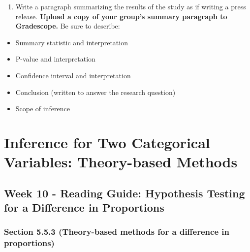 \documentclass[
]{report}
\providecommand{\tightlist}{%
  \setlength{\itemsep}{0pt}\setlength{\parskip}{0pt}}
\begin{document}
\vspace{0.8in}

\begin{enumerate}
\def\labelenumi{\arabic{enumi}.}
\setcounter{enumi}{15}
\tightlist
\item
  Write a paragraph summarizing the results of the study as if writing a press release. \textbf{Upload a copy of your group's summary paragraph to Gradescope.} Be sure to describe:
\end{enumerate}

\begin{itemize}
\item
  Summary statistic and interpretation
\item
  P-value and interpretation
\item
  Confidence interval and interpretation
\item
  Conclusion (written to answer the research question)
\item
  Scope of inference
\end{itemize}

\vspace{2in}

\hypertarget{inference-for-two-categorical-variables-theory-based-methods}{%
\chapter{Inference for Two Categorical Variables: Theory-based Methods}\label{inference-for-two-categorical-variables-theory-based-methods}}

\hypertarget{week-10---reading-guide-hypothesis-testing-for-a-difference-in-proportions}{%
\section{Week 10 - Reading Guide: Hypothesis Testing for a Difference in Proportions}\label{week-10---reading-guide-hypothesis-testing-for-a-difference-in-proportions}}

\hypertarget{section-5.5.3-theory-based-methods-for-a-difference-in-proportions}{%
\subsection*{Section 5.5.3 (Theory-based methods for a difference in proportions)}\label{section-5.5.3-theory-based-methods-for-a-difference-in-proportions}}
\end{document}
